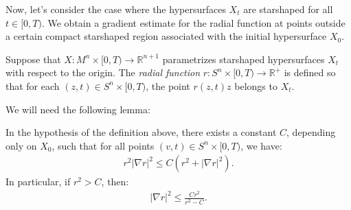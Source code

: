 Now, let’s consider the case where the hypersurfaces $ X_t $ are starshaped for all $ t \in [0, T) $. We obtain a gradient estimate for the radial function at points outside a certain compact starshaped region associated with the initial hypersurface $ X_0 $.
\begin{defin}
	Suppose that $ X : M^n \times [0, T) \to \mathbb{R}^{n+1} $ parametrizes starshaped hypersurfaces $ X_t $ with respect to the origin. The {\em radial function} $ r : S^n \times [0, T) \to \mathbb{R}^+ $ is defined so that for each $ (z, t) \in S^n \times [0, T) $, the point $ r(z, t) z $ belongs to $ X_t $. 
\end{defin}

We will need the following lemma: 

\begin{lemma}
	In the hypothesis of the definition above, there exists a constant $ C $, depending only on $ X_0 $, such that for all points $ (v, t) \in S^n \times [0, T) $, we have:
	\begin{align*}
		r^2 |\nabla r|^2 \leq C (r^2 + |\nabla r|^2).
	\end{align*}
	In particular, if $ r^2 > C $, then:
	\begin{align*}
		|\nabla r|^2 \leq \frac{C r^2}{r^2 - C}.
	\end{align*}
\end{lemma}


